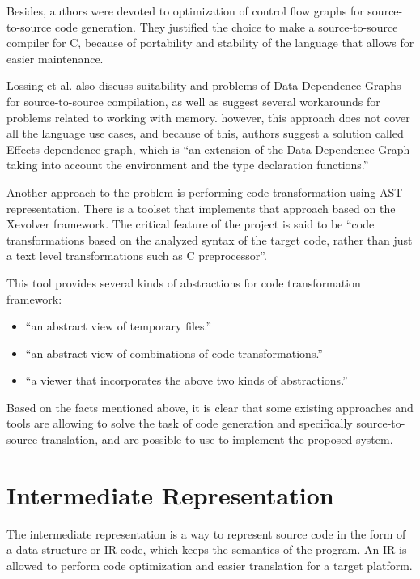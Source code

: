 Besides, authors were devoted to optimization of control flow graphs \cite{wikiCFG} for source-to-source code generation. They justified the choice to make a   source-to-source compiler for C, because of portability and stability of the language that allows for easier maintenance.

Lossing et al. also discuss suitability and problems of Data Dependence Graphs \cite{markheffernankentwilken2005} for source-to-source compilation, as well as suggest several workarounds for problems related to working with memory. however, this approach does not cover all the language use cases,   and because of this, authors suggest a solution called Effects dependence graph, which is ``an extension of the Data Dependence Graph taking into account the environment and the type declaration functions.''

Another approach to the problem is performing code transformation using AST\cite{wikiAST} representation. There is a toolset that implements that approach based on the Xevolver framework. The critical feature of the project is said to be ``code transformations based on the analyzed syntax of the target code, rather than just a text level transformations such as C preprocessor''\cite{Suda2017}.

This tool provides several kinds of abstractions for code transformation framework:
\begin{itemize}
\item ``an abstract view of temporary files.''
\item ``an abstract view of combinations of code transformations.''
\item ``a viewer that incorporates the above two kinds of abstractions.''
\end{itemize}

Based on the facts mentioned above, it is clear that some existing approaches and tools are allowing to solve the task of code generation and specifically source-to-source translation, and are possible to use to implement the proposed system.

\section{Intermediate Representation}
The intermediate representation is a way to represent source code in the form of a data structure or IR code, which keeps the semantics of the program. An IR is allowed to perform code optimization and easier translation for a target platform.

